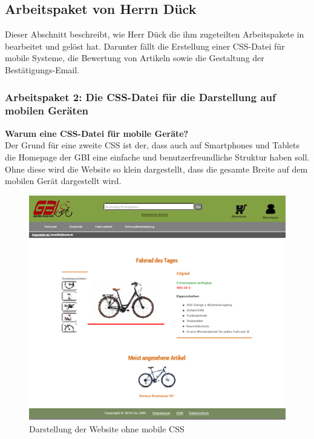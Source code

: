 \newpage
\subsection{Arbeitspaket von Herrn Dück}

Dieser Abschnitt beschreibt, wie Herr Dück die ihm zugeteilten Arbeitspakete in bearbeitet und gelöst hat. Darunter fällt die Erstellung einer CSS-Datei für mobile Systeme, die Bewertung von Artikeln sowie die Gestaltung der Bestätigungs-Email.


\subsubsection{Arbeitspaket 2: Die CSS-Datei für die Darstellung auf mobilen Geräten}

\textbf{Warum eine CSS-Datei für mobile Geräte?}
\\
Der Grund für eine zweite CSS ist der, dass auch auf Smartphones und Tablets die Homepage der GBI eine einfache und benutzerfreundliche Struktur haben soll. Ohne diese wird die Website so klein dargestellt, dass die gesamte Breite auf dem mobilen Gerät dargestellt wird.

\begin{figure}[H]
\begin{center}
\includegraphics[width=12cm]{Bilder/Michael_Abbildung1-DarstellungDerWebsiteOhneMobileCSS.png}
\end{center}
\caption{Darstellung der Website ohne mobile CSS}
\end{figure}

